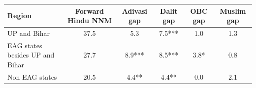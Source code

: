 \begin{tabular}{lccccc}
\hline
Region & Forward Hindu NNM & Adivasi gap & Dalit gap & OBC gap & Muslim gap \\
\hline
UP and Bihar&37.5&5.3&7.5***&1.0&1.3\\
EAG states besides UP and Bihar&27.7&8.9***&8.5***&3.8*&0.8\\
Non EAG states&20.5&4.4**&4.4**&0.0&2.1\\
\hline
\end{tabular}
